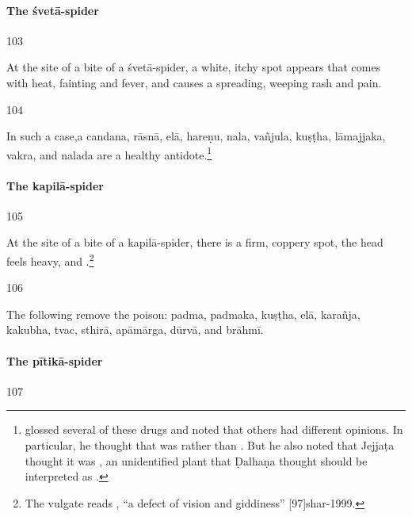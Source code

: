 \begin{translation}
\paragraph{The \Gls{śvetā-spider}}

\item[103]

At the site of a bite of a \Gls{śvetā-spider}, a white, itchy spot
appears that comes with heat, fainting and fever, and causes  
a spreading, weeping rash and pain.

\item[104]

In such a case,a
\gls{candana}, 
\gls{rāsnā}, 
\gls{elā}, 
\gls{hareṇu},
\gls{nala}, 
\gls{vañjula}, 
\gls{kuṣṭha}, 
\gls{lāmajjaka}, 
\gls{vakra},
and \gls{nalada} are a healthy
antidote.\footnote{ glossed several of these
    drugs and noted that others had different opinions.  In particular, he
    thought that  was  rather than
    . But he also noted that Jejjaṭa thought it was
    , an unidentified plant that Ḍalhaṇa thought should be
    interpreted as .}



\paragraph{The \Gls{kapilā-spider}}

\item[105]

At the site of a bite of a \Gls{kapilā-spider}, there is a firm, coppery spot, the 
head feels heavy, and .\footnote{The vulgate 
reads , “a defect of vision and giddiness” 
[97]{shar-1999}.}

\item[106]

The following remove the poison: 
\gls{padma},
\gls{padmaka},
\gls{kuṣṭha},
\gls{elā},
\gls{karañja},
\gls{kakubha},
\gls{tvac},
\gls{sthirā},
\gls{apāmārga},
\gls{dūrvā}, and
\gls{brāhmī}.



\paragraph{The \Gls{pītikā-spider}}

\item[107]


\end{translation}
